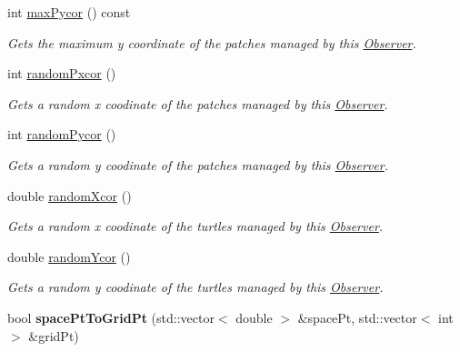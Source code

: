 \begin{DoxyCompactItemize}
int \hyperlink{classrepast_1_1relogo_1_1_observer_a7435b47c62c790d656092fce3ce1647e}{max\-Pycor} () const 
\begin{DoxyCompactList}\small\item\em Gets the maximum y coordinate of the patches managed by this \hyperlink{classrepast_1_1relogo_1_1_observer}{Observer}. \end{DoxyCompactList}\item 
int \hyperlink{classrepast_1_1relogo_1_1_observer_a8a46f049d939c640f0e4094c17145dfd}{random\-Pxcor} ()
\begin{DoxyCompactList}\small\item\em Gets a random x coodinate of the patches managed by this \hyperlink{classrepast_1_1relogo_1_1_observer}{Observer}. \end{DoxyCompactList}\item 
int \hyperlink{classrepast_1_1relogo_1_1_observer_acf3115c0cd3cbd2f2b9d979ff166daa7}{random\-Pycor} ()
\begin{DoxyCompactList}\small\item\em Gets a random y coodinate of the patches managed by this \hyperlink{classrepast_1_1relogo_1_1_observer}{Observer}. \end{DoxyCompactList}\item 
double \hyperlink{classrepast_1_1relogo_1_1_observer_a0cb7be571b2750313e6678ce01b97a2c}{random\-Xcor} ()
\begin{DoxyCompactList}\small\item\em Gets a random x coodinate of the turtles managed by this \hyperlink{classrepast_1_1relogo_1_1_observer}{Observer}. \end{DoxyCompactList}\item 
double \hyperlink{classrepast_1_1relogo_1_1_observer_aba7a10326c6c8fe6e9de52ab073981e0}{random\-Ycor} ()
\begin{DoxyCompactList}\small\item\em Gets a random y coodinate of the turtles managed by this \hyperlink{classrepast_1_1relogo_1_1_observer}{Observer}. \end{DoxyCompactList}\item 
\hypertarget{classrepast_1_1relogo_1_1_observer_a67845540835cd3976a12adea78ede7b4}{bool {\bfseries space\-Pt\-To\-Grid\-Pt} (std\-::vector$<$ double $>$ \&space\-Pt, std\-::vector$<$ int $>$ \&grid\-Pt)}\label{classrepast_1_1relogo_1_1_observer_a67845540835cd3976a12adea78ede7b4}


\end{DoxyCompactItemize}
